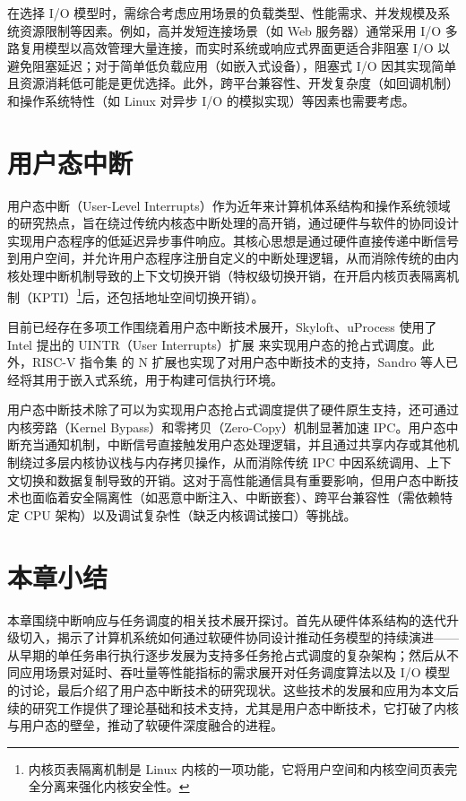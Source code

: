 在选择 I/O 模型时，需综合考虑应用场景的负载类型、性能需求、并发规模及系统资源限制等因素。例如，高并发短连接场景（如 Web 服务器）通常采用 I/O 多路复用模型以高效管理大量连接，而实时系统或响应式界面更适合非阻塞 I/O 以避免阻塞延迟；对于简单低负载应用（如嵌入式设备），阻塞式 I/O 因其实现简单且资源消耗低可能是更优选择。此外，跨平台兼容性、开发复杂度（如回调机制）和操作系统特性（如 Linux 对异步 I/O 的模拟实现）等因素也需要考虑。

\section{用户态中断}

用户态中断（User-Level Interrupts）作为近年来计算机体系结构和操作系统领域的研究热点，旨在绕过传统内核态中断处理的高开销，通过硬件与软件的协同设计实现用户态程序的低延迟异步事件响应。其核心思想是通过硬件直接传递中断信号到用户空间，并允许用户态程序注册自定义的中断处理逻辑，从而消除传统的由内核处理中断机制导致的上下文切换开销（特权级切换开销，在开启内核页表隔离机制（KPTI）\footnote{内核页表隔离机制是 Linux 内核的一项功能，它将用户空间和内核空间页表完全分离来强化内核安全性。}后，还包括地址空间切换开销）。

目前已经存在多项工作围绕着用户态中断技术展开，Skyloft\cite{jia2024skyloft}、uProcess\cite{Linjiazhen2024} 使用了 Intel 提出的 UINTR（User Interrupts）扩展 \cite{x86_uintr} 来实现用户态的抢占式调度。此外，RISC-V 指令集 \cite{riscv} 的 N 扩展也实现了对用户态中断技术的支持，Sandro 等人已经将其用于嵌入式系统，用于构建可信执行环境\cite{pintouser}。

用户态中断技术除了可以为实现用户态抢占式调度提供了硬件原生支持，还可通过内核旁路（Kernel Bypass）和零拷贝（Zero-Copy）机制显著加速 IPC。用户态中断充当通知机制，中断信号直接触发用户态处理逻辑，并且通过共享内存或其他机制绕过多层内核协议栈与内存拷贝操作，从而消除传统 IPC 中因系统调用、上下文切换和数据复制导致的开销。这对于高性能通信具有重要影响，但用户态中断技术也面临着安全隔离性（如恶意中断注入、中断嵌套）、跨平台兼容性（需依赖特定 CPU 架构）以及调试复杂性（缺乏内核调试接口）等挑战。

\section{本章小结}

本章围绕中断响应与任务调度的相关技术展开探讨。首先从硬件体系结构的迭代升级切入，揭示了计算机系统如何通过软硬件协同设计推动任务模型的持续演进——从早期的单任务串行执行逐步发展为支持多任务抢占式调度的复杂架构；然后从不同应用场景对延时、吞吐量等性能指标的需求展开对任务调度算法以及 I/O 模型的讨论，最后介绍了用户态中断技术的研究现状。这些技术的发展和应用为本文后续的研究工作提供了理论基础和技术支持，尤其是用户态中断技术，它打破了内核与用户态的壁垒，推动了软硬件深度融合的进程。
